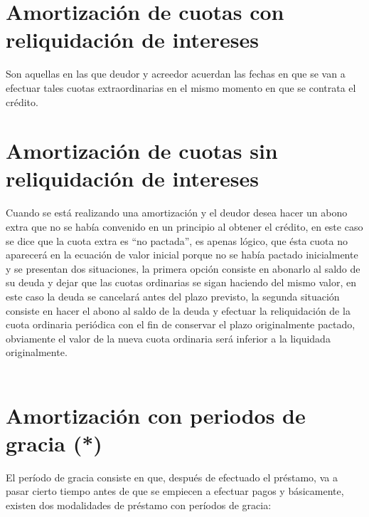 \section{Amortización de cuotas con reliquidación de intereses}

Son aquellas en las que deudor y acreedor acuerdan las fechas en que se van a efectuar tales cuotas extraordinarias en el mismo momento en que se contrata el crédito.\\




\section{Amortización de cuotas sin reliquidación de intereses }
Cuando se está realizando una amortización y el deudor desea hacer un abono extra que no se había convenido en un principio al obtener el crédito, en este caso se dice que la cuota extra es “no pactada”, es apenas lógico, que ésta cuota no aparecerá en la ecuación de valor inicial porque no se había pactado inicialmente y se presentan dos situaciones, la primera opción consiste en abonarlo al saldo de su deuda y dejar que las cuotas ordinarias se sigan haciendo del mismo valor, en este caso la deuda se cancelará antes del plazo previsto, la segunda situación consiste en hacer el abono al saldo de la deuda y efectuar la reliquidación de la cuota ordinaria periódica con el fin de conservar el plazo originalmente pactado, obviamente el valor de la nueva cuota ordinaria será inferior a la liquidada originalmente.
\\\\



\section{Amortización con periodos de gracia (*)}
El período de gracia consiste en que, después de efectuado el préstamo, va a pasar cierto tiempo antes de que se empiecen a efectuar pagos y básicamente, existen dos modalidades de préstamo con períodos de gracia:\\

